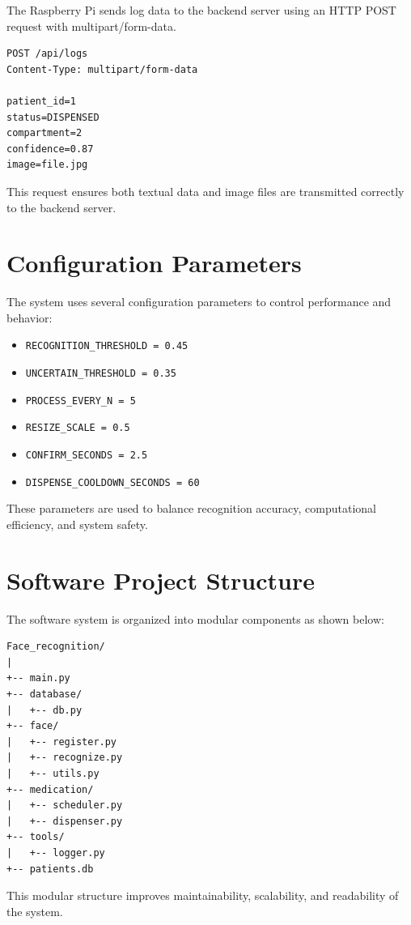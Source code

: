 The Raspberry Pi sends log data to the backend server using an HTTP POST request with multipart/form-data.

\begin{verbatim}
POST /api/logs
Content-Type: multipart/form-data

patient_id=1
status=DISPENSED
compartment=2
confidence=0.87
image=file.jpg
\end{verbatim}

This request ensures both textual data and image files are transmitted correctly to the backend server.

\section{Configuration Parameters}

The system uses several configuration parameters to control performance and behavior:

\begin{itemize}
\item \texttt{RECOGNITION\_THRESHOLD = 0.45}
\item \texttt{UNCERTAIN\_THRESHOLD = 0.35}
\item \texttt{PROCESS\_EVERY\_N = 5}
\item \texttt{RESIZE\_SCALE = 0.5}
\item \texttt{CONFIRM\_SECONDS = 2.5}
\item \texttt{DISPENSE\_COOLDOWN\_SECONDS = 60}
\end{itemize}

These parameters are used to balance recognition accuracy, computational efficiency, and system safety.

\section{Software Project Structure}

The software system is organized into modular components as shown below:

\begin{verbatim}
Face_recognition/
|
+-- main.py
+-- database/
|   +-- db.py
+-- face/
|   +-- register.py
|   +-- recognize.py
|   +-- utils.py
+-- medication/
|   +-- scheduler.py
|   +-- dispenser.py
+-- tools/
|   +-- logger.py
+-- patients.db
\end{verbatim}

This modular structure improves maintainability, scalability, and readability of the system.

